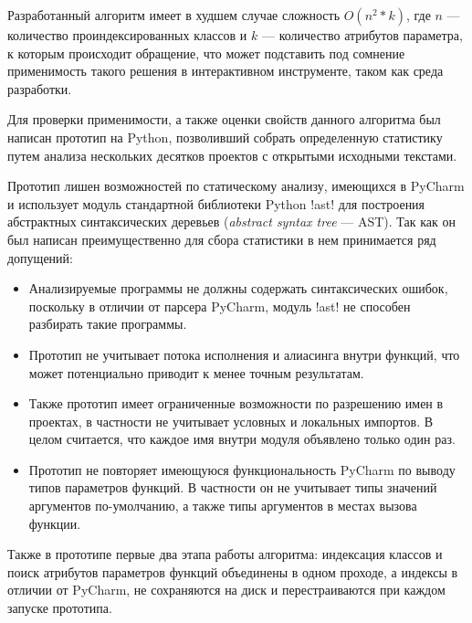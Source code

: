 Разработанный алгоритм имеет в худшем случае сложность $O(n^2*k)$, где $n$ ---
количество проиндексированных классов и $k$ --- количество атрибутов параметра,
к которым происходит обращение, что может подставить под сомнение применимость
такого решения в интерактивном инструменте, таком как среда разработки. 

Для проверки применимости, а также оценки свойств данного алгоритма был написан
прототип на Python, позволивший собрать определенную статистику путем анализа
нескольких десятков проектов с открытыми исходными текстами.

Прототип лишен возможностей по статическому анализу, имеющихся в PyCharm и
использует модуль стандартной библиотеки Python !ast! для построения абстрактных
синтаксических деревьев (\emph{abstract syntax tree} --- AST). Так как он был
написан преимущественно для сбора статистики в нем принимается ряд допущений:


\begin{itemize}
    \item Анализируемые программы не должны содержать синтаксических ошибок,
        поскольку в отличии от парсера PyCharm, модуль !ast! не способен
        разбирать такие программы.

    \item Прототип не учитывает потока исполнения и алиасинга внутри функций, что
        может потенциально приводит к менее точным результатам.

    \item Также прототип имеет ограниченные возможности по разрешению имен в проектах, в
        частности не учитывает условных и локальных импортов. В целом считается,
        что каждое имя внутри модуля объявлено только один раз.

    \item Прототип не повторяет имеющуюся функциональность PyCharm по
        выводу типов параметров функций. В частности он не учитывает типы
        значений аргументов по-умолчанию, а также типы аргументов в местах
        вызова функции. 

\end{itemize}

Также в прототипе первые два этапа работы алгоритма: индексация классов и поиск
атрибутов параметров функций объединены в одном проходе, а индексы в отличии от
PyCharm, не сохраняются на диск и перестраиваются при каждом запуске прототипа.

